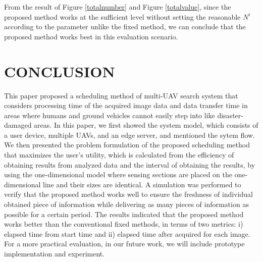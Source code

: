 \documentclass{ieeeaccess}
\begin{document}
From the result of Figure \ref{totalnumber} and Figure \ref{totalvalue}, since the proposed method works at the sufficient level without setting the reasonable $N^i$ according to the parameter unlike the fixed method, we can conclude that the proposed method works best in this evaluation scenario.


\section{CONCLUSION}
This paper proposed a scheduling method of multi-UAV search system that considers processing time of the acquired image data and data transfer time in areas where humans and ground vehicles cannot easily step into like disaster-damaged areas.
In this paper, we first showed the system model, which consists of a user device, multiple UAVs, and an edge server, and mentioned the sytem flow. 
We then presented the problem formulation of the proposed scheduling method that maximizes the user's utility, which is calculated from the efficiency of obtaining results from analyzed data and the interval of obtaining the results, by using the one-dimensional model where sensing sections are placed on the one-dimensional line and their sizes are identical.
A simulation was performed to verify that the proposed method works well to ensure the freshness of individual obtained piece of information while delivering as many pieces of information as possible for a certain period.
The results indicated that the proposed method works better than the conventional fixed methods, in terms of two metrics: i) elapsed time from start time and ii) elapsed time after acquired for each image.
For a more practical evaluation, in our future work, we will include prototype implementation and experiment.


\end{document}
